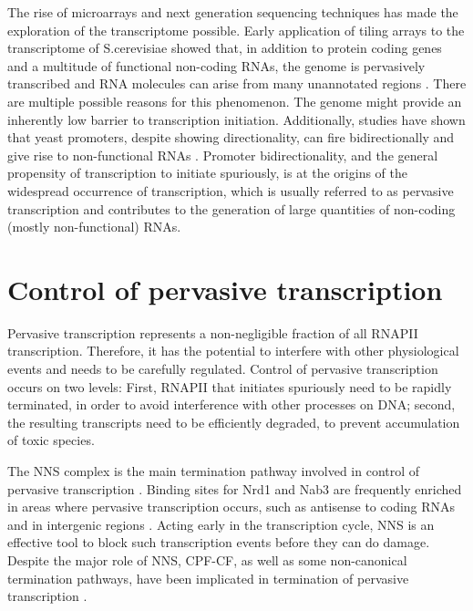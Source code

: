 The rise of microarrays and next generation sequencing techniques has made the exploration of the transcriptome possible. 
Early application of tiling arrays to the transcriptome of S.cerevisiae showed that, in addition to protein coding genes and a multitude of functional non-coding RNAs, the genome is pervasively transcribed and RNA molecules can arise from many unannotated regions \cite{xu:2009:bidirectional, neil:2009:widespread,david:2006:highresolution}. 
There are multiple possible reasons for this phenomenon. 
The genome might provide an inherently low barrier to transcription initiation. 
Additionally, studies have shown that yeast promoters, despite showing directionality, can fire bidirectionally and give rise to non-functional RNAs \cite{xu:2009:bidirectional, neil:2009:widespread}. 
Promoter bidirectionality, and the general propensity of transcription to initiate spuriously, is at the origins of the widespread occurrence of transcription, which is usually referred to as pervasive transcription and contributes to the generation of large quantities of non-coding (mostly non-functional) RNAs. 

\section{Control of pervasive transcription}

Pervasive transcription represents a non-negligible fraction of all RNAPII transcription. 
Therefore, it has the potential to interfere with other physiological events and needs to be carefully regulated. 
Control of pervasive transcription occurs on two levels: First, RNAPII that initiates spuriously need to be rapidly terminated, in order to avoid interference with other processes on DNA; second, the resulting transcripts need to be efficiently degraded, to prevent accumulation of toxic species. 

The NNS complex is the main termination pathway involved in control of pervasive transcription \cite{arigo:2006:regulation, thiebaut:2006:transcription}. 
Binding sites for Nrd1 and Nab3 are frequently enriched in areas where pervasive transcription occurs, such as antisense to coding RNAs and in intergenic regions \cite{thiebaut:2006:transcription}. 
Acting early in the transcription cycle, NNS is an effective tool to block such transcription events before they can do damage. 
Despite the major role of NNS, CPF-CF, as well as some non-canonical termination pathways, have been implicated in termination of pervasive transcription \cite{marquardt:2011:distinct, vandijk:2011:xuts,colin:2014:roadblock}.

